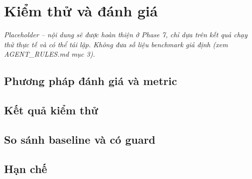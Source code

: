 \chapter{Kiểm thử và đánh giá}
\label{ch:kiem-thu-danh-gia}

\textit{Placeholder -- nội dung sẽ được hoàn thiện ở Phase 7, chỉ dựa trên kết quả chạy thử thực tế và có thể tái lập. Không đưa số liệu benchmark giả định (xem AGENT\_RULES.md mục 3).}

\section{Phương pháp đánh giá và metric}

\section{Kết quả kiểm thử}

\section{So sánh baseline và có guard}

\section{Hạn chế}
